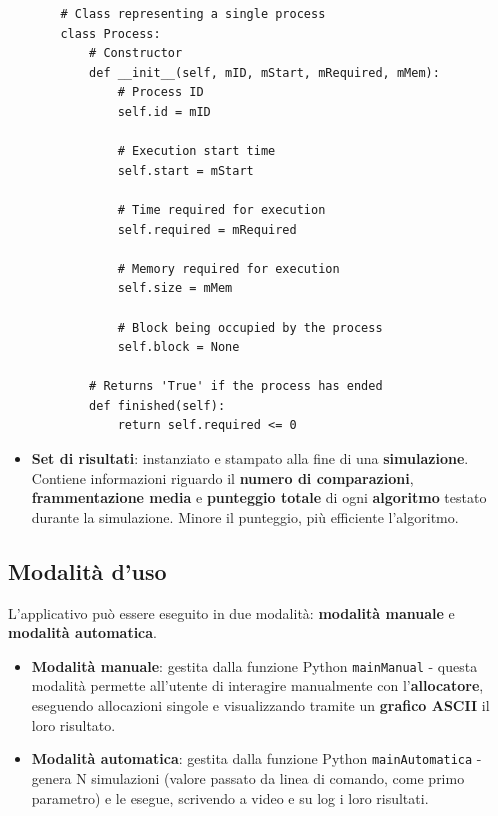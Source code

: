 \documentclass[12pt]{report}
\renewcommand\emph{\textbf}
\begin{document}
\begin{itemize}
            \begin{verbatim}
    # Class representing a single process
    class Process:
        # Constructor
        def __init__(self, mID, mStart, mRequired, mMem):
            # Process ID
            self.id = mID

            # Execution start time
            self.start = mStart

            # Time required for execution
            self.required = mRequired

            # Memory required for execution
            self.size = mMem

            # Block being occupied by the process
            self.block = None

        # Returns 'True' if the process has ended
        def finished(self):
            return self.required <= 0
            \end{verbatim}

            \item \emph{Set di risultati}: instanziato e stampato alla fine di una \emph{simulazione}. Contiene informazioni riguardo il \emph{numero di comparazioni}, \emph{frammentazione media} e \emph{punteggio totale} di ogni \emph{algoritmo} testato durante la simulazione. Minore il punteggio, più efficiente l'algoritmo.
        \end{itemize}


        \subsection{Modalità d'uso}

        L'applicativo può essere eseguito in due modalità: \emph{modalità manuale} e \emph{modalità automatica}.

        \begin{itemize}
            \item \emph{Modalità manuale}: gestita dalla funzione Python \texttt{mainManual} - questa modalità permette all'utente di interagire manualmente con l'\emph{allocatore}, eseguendo allocazioni singole e visualizzando tramite un \emph{grafico ASCII} il loro risultato.

            \item \emph{Modalità automatica}: gestita dalla funzione Python \texttt{mainAutomatica} - genera N simulazioni (valore passato da linea di comando, come primo parametro) e le esegue, scrivendo a video e su log i loro risultati. 
        \end{itemize}
\end{document}
